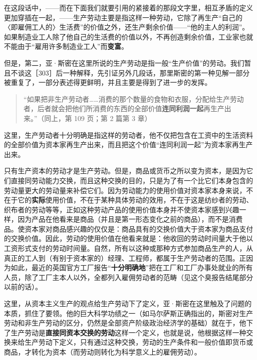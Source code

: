 在这段话中，——而在下面我们就要引用的紧接着的那段文字里，相互矛盾的定义更加穿插在一起，——生产劳动主要是指这样一种劳动，它除了再生产“自己的〈即雇佣工人的〉生活费”的价值之外，还生产剩余价值——“他的主人的利润”。如果制造业工人除了他自己的生活费的价值以外，不再创造剩余价值，工业家也就不能由于“雇用许多制造业工人”而\textbf{变富}。

但是，第二，亚·斯密在这里所说的生产劳动是指一般“生产价值”的劳动。我们暂且不谈这［303］后一种解释，先引证另外几段话，那里斯密的第一种见解一部分被重复了，一部分表述得更鲜明，并且主要是得到了进一步的发挥。

\begin{quote}“如果把非生产劳动者……消费的那个数量的食物和衣服，分配给生产劳动者，后者就会把他们所消费的东西的全部价值\textbf{连同利润一起}再生产出来。”（同上，第 109 页；第 2 篇第 3 章）\end{quote}

这里，生产劳动者十分明确是指这样的劳动者，他不仅把包含在工资中的生活资料的全部价值为资本家再生产出来，而且把这个价值“连同利润一起”为资本家再生产出来。

只有生产资本的劳动才是生产劳动。但是，商品或货币之所以变为资本，是因为它们直接同劳动能力交换，而且这种交换的目的，只是为了有一个比它们本身包含的劳动量更大的劳动量来补偿它们。因为劳动能力的使用价值对资本家本身来说，不在于它的\textbf{实际}使用价值，不在于某种具体劳动的效用，不在于这是纺纱者的劳动、织布者的劳动等等，正如这种劳动产品的使用价值本身并不使资本家感到兴趣一样，因为产品在他看来是商品（并且是第一形态变化之前的商品），而不是消费品。使资本家对商品感兴趣的仅仅是：商品具有的交换价值大于资本家为商品支付的交换价值。因此，劳动的使用价值在他看来就是：他收回的劳动时间量大于他以工资形式支付的劳动时间量。自然，所有以这种或那种方式参加商品生产的人，从真正的工人到（有别于资本家的）经理、工程师，都属于生产劳动者的范围。正因为如此，最近的英国官方工厂报告“\textbf{十分明确地}”把在工厂和工厂办事处就业的所有人员，除了工厂主本人以外，全都列入雇佣劳动者的范畴（见这个臭报告结尾部分以前的话）。

这里，从资本主义生产的观点给生产劳动下了定义，亚·斯密在这里触及了问题的本质，抓住了要领。他的巨大科学功绩之一（如马尔萨斯正确指出的，斯密对生产劳动和非生产劳动的区分，仍然是全部资产阶级政治经济学的基础）就在于，他下了生产劳动是\textbf{直接同资本交换的劳动}这样一个定义，也就是说，他根据这样一种交换来给生产劳动下定义，只有通过这种交换，劳动的生产条件和一般价值即货币或商品，才转化为资本（而劳动则转化为科学意义上的雇佣劳动）。

